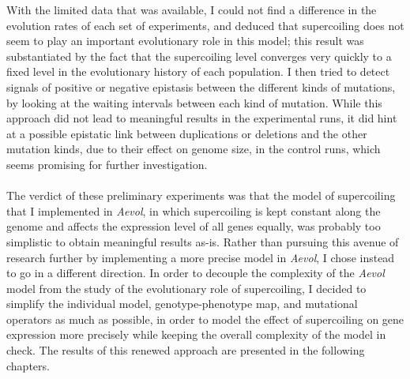 With the limited data that was available, I could not find a difference in the evolution rates of each set of experiments, and deduced that supercoiling does not seem to play an important evolutionary role in this model; this result was substantiated by the fact that the supercoiling level converges very quickly to a fixed level in the evolutionary history of each population.
I then tried to detect signals of positive or negative epistasis between the different kinds of mutations, by looking at the waiting intervals between each kind of mutation.
While this approach did not lead to meaningful results in the experimental runs, it did hint at a possible epistatic link between duplications or deletions and the other mutation kinds, due to their effect on genome size, in the control runs, which seems promising for further investigation.

\paragraph{}
The verdict of these preliminary experiments was that the model of supercoiling that I implemented in \emph{Aevol}, in which supercoiling is kept constant along the genome and affects the expression level of all genes equally, was probably too simplistic to obtain meaningful results as-is.
Rather than pursuing this avenue of research further by implementing a more precise model in \emph{Aevol}, I chose instead to go in a different direction.
In order to decouple the complexity of the \emph{Aevol} model from the study of the evolutionary role of supercoiling, I decided to simplify the individual model, genotype-phenotype map, and mutational operators as much as possible, in order to model the effect of supercoiling on gene expression more precisely while keeping the overall complexity of the model in check.
The results of this renewed approach are presented in the following chapters.